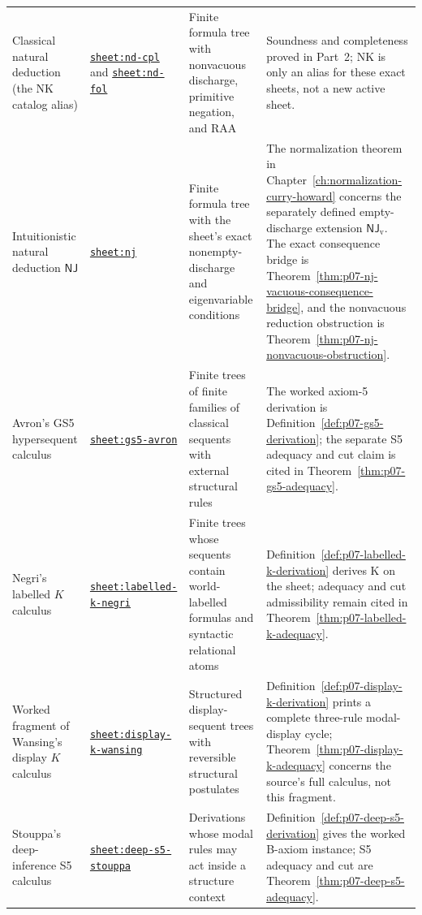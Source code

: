\begin{longtable}{@{}p{}p{}p{}
  p{}@{}}
Classical natural deduction (the NK catalog alias) &
\hyperref[sheet:nd-cpl]{\texttt{sheet:nd-cpl}} and
\hyperref[sheet:nd-fol]{\texttt{sheet:nd-fol}} & Finite formula tree with
nonvacuous discharge, primitive negation, and RAA & Soundness and
completeness proved in Part~2; NK is only an alias for these exact sheets,
not a new active sheet. \\
Intuitionistic natural deduction \(\mathsf{NJ}\) &
\hyperref[sheet:nj]{\texttt{sheet:nj}} & Finite formula tree with the
sheet's exact nonempty-discharge and eigenvariable conditions & The normalization
theorem in Chapter~\ref{ch:normalization-curry-howard} concerns the separately
defined empty-discharge extension \(\mathsf{NJ}_{\mathrm v}\).
The exact consequence bridge is Theorem~\ref{thm:p07-nj-vacuous-consequence-bridge},
and the nonvacuous reduction obstruction is Theorem~\ref{thm:p07-nj-nonvacuous-obstruction}. \\
Avron's GS5 hypersequent calculus &
\hyperref[sheet:gs5-avron]{\texttt{sheet:gs5-avron}} & Finite trees of
finite families of classical sequents with external structural rules & The
worked axiom-5 derivation is Definition~\ref{def:p07-gs5-derivation}; the
separate S5 adequacy and cut claim is cited in
Theorem~\ref{thm:p07-gs5-adequacy}. \\
Negri's labelled \(K\) calculus &
\hyperref[sheet:labelled-k-negri]{\texttt{sheet:labelled-k-negri}} & Finite
trees whose sequents contain world-labelled formulas and syntactic relational
atoms & Definition~\ref{def:p07-labelled-k-derivation} derives K on the sheet;
adequacy and cut admissibility remain cited in
Theorem~\ref{thm:p07-labelled-k-adequacy}. \\
Worked fragment of Wansing's display \(K\) calculus &
\hyperref[sheet:display-k-wansing]{\texttt{sheet:display-k-wansing}} &
Structured display-sequent trees with reversible structural postulates &
Definition~\ref{def:p07-display-k-derivation} prints a complete three-rule
modal-display cycle; Theorem~\ref{thm:p07-display-k-adequacy} concerns the
source's full calculus, not this fragment. \\
Stouppa's deep-inference S5 calculus &
\hyperref[sheet:deep-s5-stouppa]{\texttt{sheet:deep-s5-stouppa}} & Derivations
whose modal rules may act inside a structure context &
Definition~\ref{def:p07-deep-s5-derivation} gives the worked B-axiom instance;
S5 adequacy and cut are Theorem~\ref{thm:p07-deep-s5-adequacy}. \\
\bottomrule
\end{longtable}
\endgroup

